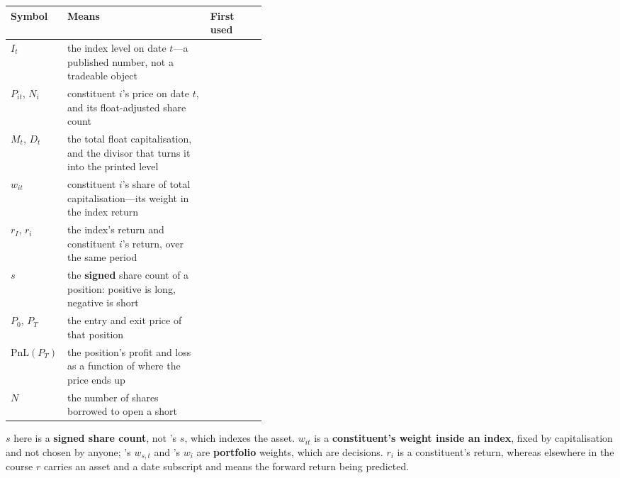 \begin{xltabular}{\linewidth}{|>{\raggedright\arraybackslash}p{0.20\linewidth}|X|>{\raggedright\arraybackslash}p{0.22\linewidth}|}
\hline
\textbf{Symbol} & \textbf{Means} & \textbf{First used} \\ \hline
\endhead
$I_t$
  & the index level on date $t$---a published number, not a tradeable object
  &  \\ \hline
$P_{it}$, $N_i$
  & constituent $i$'s price on date $t$, and its float-adjusted share count
  &  \\ \hline
$M_t$, $D_t$
  & the total float capitalisation, and the divisor that turns it into the printed level
  &  \\ \hline
$w_{it}$
  & constituent $i$'s share of total capitalisation---its weight in the index return
  &  \\ \hline
$r_I$, $r_i$
  & the index's return and constituent $i$'s return, over the same period
  &  \\ \hline
$s$
  & the \textbf{signed} share count of a position: positive is long, negative is short
  &  \\ \hline
$P_0$, $P_T$
  & the entry and exit price of that position
  &  \\ \hline
$\mathrm{PnL}(P_T)$
  & the position's profit and loss as a function of where the price ends up
  &  \\ \hline
$N$
  & the number of shares borrowed to open a short
  &  \\ \hline
\end{xltabular}

\begin{note}
$s$ here is a \textbf{signed share count}, not
's $s$, which indexes the asset. $w_{it}$ is a
\textbf{constituent's weight inside an index}, fixed by capitalisation and not chosen by anyone;
's $w_{s,t}$ and
's $w_i$ are \textbf{portfolio} weights, which are decisions.
$r_i$ is a constituent's return, whereas elsewhere in the course $r$ carries an asset and a date
subscript and means the forward return being predicted.
\end{note}
